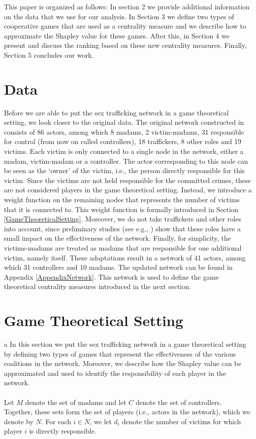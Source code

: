 \documentclass[10p]{article}
\theoremstyle{definition}
\theoremstyle{definition}
\begin{document}
This paper is organized as follows: In section 2 we provide additional information on the data that we use for our analysis. In Section 3 we define two types of cooperative games that are used as a centrality measure and we describe how to approximate the Shapley value for these games. After this, in Section 4 we present and discuss the ranking based on these new centrality measures. Finally, Section 5 concludes our work.

\section{Data}
Before we are able to put the sex trafficking network in a game theoretical setting, we look closer to the original data. The original network constructed in \cite{mancuso2014not} consists of 86 actors, among which 8 madams, 2 victim-madams, 31 responsible for control (from now on called controllers), 18 traffickers, 8 other roles and 19 victims. Each victim is only connected to a single node in the network, either a madam, victim-madam or a controller. The actor corresponding to this node can be seen as the `owner' of the victim, i.e., the person directly responsible for this victim. Since the victims are not held responsible for the committed crimes, these are not considered players in the game theoretical setting. Instead, we introduce a weight function on the remaining nodes that represents the number of victims that it is connected to. This weight function is formally introduced in Section \ref{GameTheoreticalSetting}. Moreover, we do not take traffickers and other roles into account, since preliminary studies (see e.g., \cite{mancuso2014not}) show that these roles have a small impact on the effectiveness of the network. Finally, for simplicity, the victims-madams are treated as madams that are responsible for one additional victim, namely itself. These adaptations result in a network of 41 actors, among which 31 controllers and 10 madams. The updated network can be found in Appendix \ref{AppendixNetwork}. This network is used to define the game theoretical centrality measures introduced in the next section.

\section{Game Theoretical Setting} a \label{GameTheoreticalSetting}
In this section we put the sex trafficking network in a game theoretical setting by defining two types of games that represent the effectiveness of the various coalitions in the network. Moreover, we describe how the Shapley value \cite{shapley1953value} can be approximated and used to identify the responsibility of each player in the network.\\ \\
Let $M$ denote the set of madams and let $C$ denote the set of controllers. Together, these sets form the set of players (i.e., actors in the network), which we denote by $N$. For each $i \in N$, we let $d_i$ denote the number of victims for which player $i$ is directly responsible. 
\end{document}
